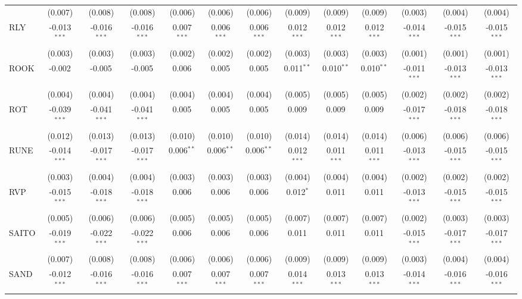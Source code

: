 \begin{table}[!htbp]
\begin{tabular}{@{\extracolsep{5pt}}lcccccccccccc}
  & (0.007) & (0.008) & (0.008) & (0.006) & (0.006) & (0.006) & (0.009) & (0.009) & (0.009) & (0.003) & (0.004) & (0.004) \\
 RLY & -0.013$^{***}$ & -0.016$^{***}$ & -0.016$^{***}$ & 0.007$^{***}$ & 0.006$^{***}$ & 0.006$^{***}$ & 0.012$^{***}$ & 0.012$^{***}$ & 0.012$^{***}$ & -0.014$^{***}$ & -0.015$^{***}$ & -0.015$^{***}$ \\
  & (0.003) & (0.003) & (0.003) & (0.002) & (0.002) & (0.002) & (0.003) & (0.003) & (0.003) & (0.001) & (0.001) & (0.001) \\
 ROOK & -0.002$^{}$ & -0.005$^{}$ & -0.005$^{}$ & 0.006$^{}$ & 0.005$^{}$ & 0.005$^{}$ & 0.011$^{**}$ & 0.010$^{**}$ & 0.010$^{**}$ & -0.011$^{***}$ & -0.013$^{***}$ & -0.013$^{***}$ \\
  & (0.004) & (0.004) & (0.004) & (0.004) & (0.004) & (0.004) & (0.005) & (0.005) & (0.005) & (0.002) & (0.002) & (0.002) \\
 ROT & -0.039$^{***}$ & -0.041$^{***}$ & -0.041$^{***}$ & 0.005$^{}$ & 0.005$^{}$ & 0.005$^{}$ & 0.009$^{}$ & 0.009$^{}$ & 0.009$^{}$ & -0.017$^{***}$ & -0.018$^{***}$ & -0.018$^{***}$ \\
  & (0.012) & (0.013) & (0.013) & (0.010) & (0.010) & (0.010) & (0.014) & (0.014) & (0.014) & (0.006) & (0.006) & (0.006) \\
 RUNE & -0.014$^{***}$ & -0.017$^{***}$ & -0.017$^{***}$ & 0.006$^{**}$ & 0.006$^{**}$ & 0.006$^{**}$ & 0.012$^{***}$ & 0.011$^{***}$ & 0.011$^{***}$ & -0.013$^{***}$ & -0.015$^{***}$ & -0.015$^{***}$ \\
  & (0.003) & (0.004) & (0.004) & (0.003) & (0.003) & (0.003) & (0.004) & (0.004) & (0.004) & (0.002) & (0.002) & (0.002) \\
 RVP & -0.015$^{***}$ & -0.018$^{***}$ & -0.018$^{***}$ & 0.006$^{}$ & 0.006$^{}$ & 0.006$^{}$ & 0.012$^{*}$ & 0.011$^{}$ & 0.011$^{}$ & -0.013$^{***}$ & -0.015$^{***}$ & -0.015$^{***}$ \\
  & (0.005) & (0.006) & (0.006) & (0.005) & (0.005) & (0.005) & (0.007) & (0.007) & (0.007) & (0.002) & (0.003) & (0.003) \\
 SAITO & -0.019$^{***}$ & -0.022$^{***}$ & -0.022$^{***}$ & 0.006$^{}$ & 0.006$^{}$ & 0.006$^{}$ & 0.011$^{}$ & 0.011$^{}$ & 0.011$^{}$ & -0.015$^{***}$ & -0.017$^{***}$ & -0.017$^{***}$ \\
  & (0.007) & (0.008) & (0.008) & (0.006) & (0.006) & (0.006) & (0.009) & (0.009) & (0.009) & (0.003) & (0.004) & (0.004) \\
 SAND & -0.012$^{***}$ & -0.016$^{***}$ & -0.016$^{***}$ & 0.007$^{***}$ & 0.007$^{***}$ & 0.007$^{***}$ & 0.014$^{***}$ & 0.013$^{***}$ & 0.013$^{***}$ & -0.014$^{***}$ & -0.016$^{***}$ & -0.016$^{***}$ \\

\end{tabular}
\end{table}
